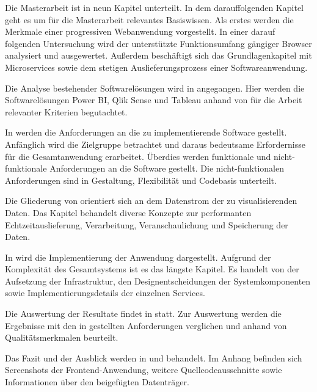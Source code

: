 Die Masterarbeit ist in neun Kapitel unterteilt. In dem darauffolgenden Kapitel geht es um für
die Masterarbeit relevantes Basiswissen. Als erstes werden die Merkmale einer progressiven
Webanwendung vorgestellt. In einer darauf folgenden Untersuchung wird der
unterstützte Funktionsumfang gängiger Browser analysiert und ausgewertet.
Außerdem beschäftigt sich das Grundlagenkapitel mit Microservices
sowie dem stetigen Auslieferungsprozess einer Softwareanwendung.

Die Analyse bestehender Softwarelösungen wird in 
angegangen. Hier werden die Softwarelösungen Power BI, Qlik Sense und Tableau anhand von für
die Arbeit relevanter Kriterien begutachtet.

In  werden die Anforderungen an die zu implementierende Software
gestellt. Anfänglich wird die Zielgruppe betrachtet und daraus bedeutsame Erfordernisse
für die Gesamtanwendung erarbeitet. Überdies werden funktionale und nicht-funktionale Anforderungen
an die Software gestellt. Die nicht-funktionalen Anforderungen sind in 
Gestaltung, Flexibilität und Codebasis unterteilt.

Die Gliederung von  orientiert sich an dem Datenstrom der zu visualisierenden
Daten. Das Kapitel behandelt diverse Konzepte zur performanten Echtzeitauslieferung, Verarbeitung,
Veranschaulichung und Speicherung der Daten.

In  wird die Implementierung der Anwendung dargestellt. Aufgrund der Komplexität
des Gesamtsystems ist es das längste Kapitel. Es handelt von der Aufsetzung der Infrastruktur, den Designentscheidungen
der Systemkomponenten sowie Implementierungsdetails der einzelnen Services.

Die Auswertung der Resultate findet in  statt. Zur Auswertung werden
die Ergebnisse mit den in  gestellten Anforderungen verglichen
und anhand von Qualitätsmerkmalen beurteilt.

Das Fazit und der Ausblick werden in  und  behandelt. Im Anhang befinden
sich Screenshots der Frontend-Anwendung, weitere Quellcodeausschnitte sowie Informationen
über den beigefügten Datenträger.
